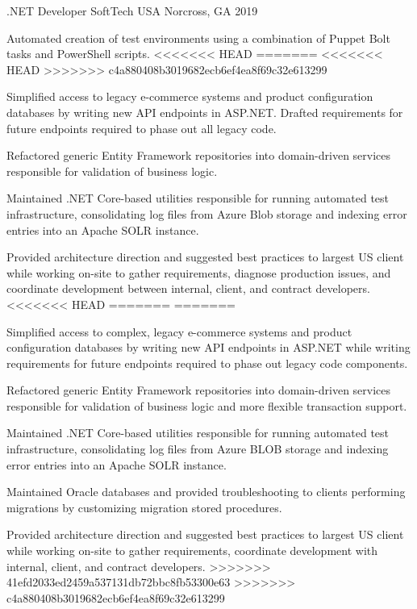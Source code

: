 \begin{cventries}
  \cventry
    {.NET Developer} %
    {SoftTech USA} %
    {Norcross, GA} %
    {2019} %
    {
      \begin{cvitems} %
        \item {Automated creation of test environments using a combination of Puppet Bolt tasks and PowerShell scripts.}
<<<<<<< HEAD
=======
<<<<<<< HEAD
>>>>>>> c4a880408b3019682ecb6ef4ea8f69c32e613299
        \item {Simplified access to legacy e-commerce systems and product configuration databases by writing new API endpoints in ASP.NET. Drafted requirements for future endpoints required to phase out all legacy code.}
        \item {Refactored generic Entity Framework repositories into domain-driven services responsible for validation of business logic.}
        \item {Maintained .NET Core-based utilities responsible for running automated test infrastructure, consolidating log files from Azure Blob storage and indexing error entries into an Apache SOLR instance.}
        \item {Provided architecture direction and suggested best practices to largest US client while working on-site to gather requirements, diagnose production issues, and coordinate development between internal, client, and contract developers.}
<<<<<<< HEAD
=======
=======
        \item {Simplified access to complex, legacy e-commerce systems and product configuration databases by writing new API endpoints in ASP.NET while writing requirements for future endpoints required to phase out legacy code components.}
        \item {Refactored generic Entity Framework repositories into domain-driven services responsible for validation of business logic and more flexible transaction support.}
        \item {Maintained .NET Core-based utilities responsible for running automated test infrastructure, consolidating log files from Azure BLOB storage and indexing error entries into an Apache SOLR instance.}
        \item {Maintained Oracle databases and provided troubleshooting to clients performing migrations by customizing migration stored procedures.}
        \item {Provided architecture direction and suggested best practices to largest US client while working on-site to gather requirements, coordinate development with internal, client, and contract developers.}
>>>>>>> 41efd2033ed2459a537131db72bbc8fb53300e63
>>>>>>> c4a880408b3019682ecb6ef4ea8f69c32e613299
      \end{cvitems}
    }


\end{cventries}
